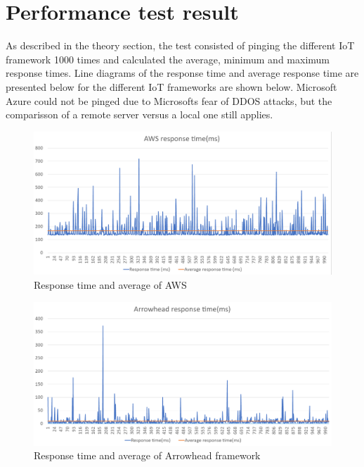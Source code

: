 \section{Performance test result}
As described in the theory section, the test consisted of pinging the different IoT framework 1000 times and calculated the average, minimum and maximum response times. 
Line diagrams of the response time and average response time are presented below for the different IoT frameworks are shown below.
Microsoft Azure could not be pinged due to Microsofts fear of DDOS attacks, but the comparisson of a remote server versus a local one still applies.  
\begin{figure}[h!]
    \centering
    \includegraphics[width=\textwidth]{Pictures/AWS_response_time.png} 
    \caption{Response time and average of AWS}
    \label{AWS response time}
\end{figure}

\begin{figure}[h!]
    \centering
    \includegraphics[width=\textwidth]{Pictures/AH_response_time.png} 
    \caption{Response time and average of Arrowhead framework}
    \label{AH response time}
\end{figure}

